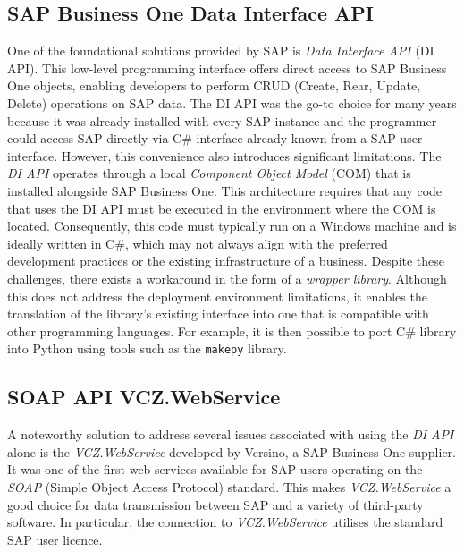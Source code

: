 \subsection{SAP Business One Data Interface API}
\label{subsec:sap-b1-di-api}

One of the foundational solutions provided by SAP is \textit{Data Interface API} (DI API).
This low-level programming interface offers direct access to SAP Business One objects, enabling developers to perform CRUD (Create, Rear, Update, Delete) operations on SAP data. 
The DI API was the go-to choice for many years because it was already installed with every SAP instance and the programmer could access SAP directly via C\# interface already known from a SAP user interface.
However, this convenience also introduces significant limitations.
The \textit{DI API} operates through a local \textit{Component Object Model} (COM) that is installed alongside SAP Business One.
This architecture requires that any code that uses the DI API must be executed in the environment where the COM is located.
Consequently, this code must typically run on a Windows machine and is ideally written in C\#, which may not always align with the preferred development practices or the existing infrastructure of a business.
Despite these challenges, there exists a workaround in the form of a \textit{wrapper library}.
Although this does not address the deployment environment limitations, it enables the translation of the library's existing interface into one that is compatible with other programming languages.
For example, it is then possible to port C\# library into Python using tools such as the \lstinline[language=Python]{makepy} library.


\subsection{SOAP API VCZ.WebService}
A noteworthy solution to address several issues associated with using the \textit{DI API} alone  is the \textit{VCZ.WebService} developed by Versino, a SAP Business One supplier. 
It was one of the first web services available for SAP users operating on the \textit{SOAP} (Simple Object Access Protocol) standard. 
This makes \textit{VCZ.WebService} a good choice for data transmission between SAP and a variety of third-party software.
In particular, the connection to \textit{VCZ.WebService} utilises the standard SAP user licence.

